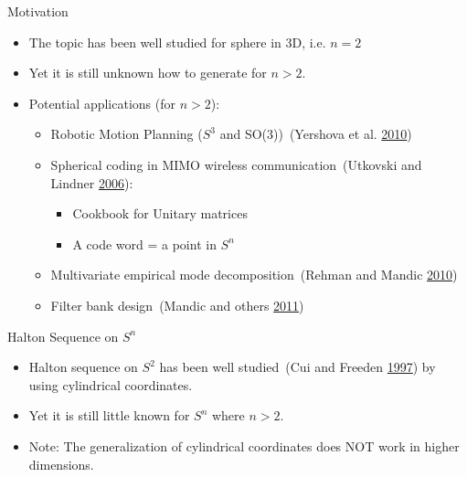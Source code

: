 \begin{frame}{Motivation}
\protect\hypertarget{motivation}{}

\begin{itemize}
\item
  The topic has been well studied for sphere in 3D, i.e. \(n=2\)
\item
  Yet it is still unknown how to generate for \(n > 2\).
\item
  Potential applications (for \(n > 2\)):

  \begin{itemize}
  \item
    Robotic Motion Planning (\(S^3\) and SO(3))~(Yershova et al.
    \protect\hyperlink{ref-yershova2010generating}{2010})
  \item
    Spherical coding in MIMO wireless communication~(Utkovski and
    Lindner \protect\hyperlink{ref-utkovski2006construction}{2006}):

    \begin{itemize}
    \item
      Cookbook for Unitary matrices
    \item
      A code word = a point in \(S^n\)
    \end{itemize}
  \item
    Multivariate empirical mode decomposition~(Rehman and Mandic
    \protect\hyperlink{ref-rehman2010multivariate}{2010})
  \item
    Filter bank design~(Mandic and others
    \protect\hyperlink{ref-mandic2011filter}{2011})
  \end{itemize}
\end{itemize}

\end{frame}

\begin{frame}{Halton Sequence on \(S^n\)}
\protect\hypertarget{halton-sequence-on-sn}{}

\begin{itemize}
\item
  Halton sequence on \(S^2\) has been well studied~(Cui and Freeden
  \protect\hyperlink{ref-cui1997equidistribution}{1997}) by using
  cylindrical coordinates.
\item
  Yet it is still little known for \(S^n\) where \(n>2\).
\item
  Note: The generalization of cylindrical coordinates does NOT work in
  higher dimensions.
\end{itemize}

\end{frame}

